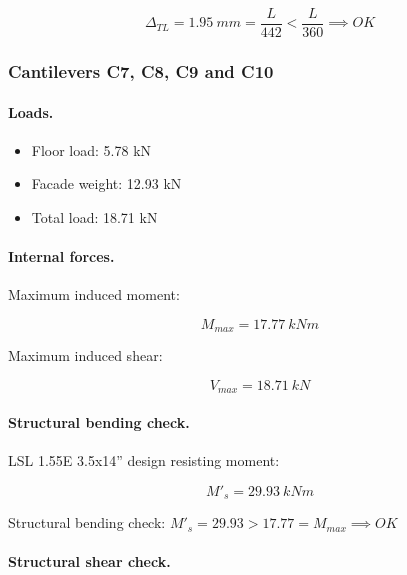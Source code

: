 \begin{equation}
  \Delta_{TL}= 1.95\ mm= \frac{L}{442} < \frac{L}{360} \implies OK
\end{equation}

\subsubsection{Cantilevers C7, C8, C9 and C10}

\paragraph{Loads.}

\begin{itemize}
\item Floor load: 5.78 kN
\item Facade weight: 12.93 kN
\item Total load: 18.71 kN
\end{itemize}

\paragraph{Internal forces.}

\noindent Maximum induced moment:

\begin{equation}
  M_{max}= 17.77\ kN m
\end{equation}

\noindent Maximum induced shear:

\begin{equation}
  V_{max}= 18.71\ kN
\end{equation}

\paragraph{Structural bending check.}

\noindent LSL 1.55E 3.5x14'' design resisting moment:

\begin{equation}
  M'_s= 29.93\ kN m
\end{equation}

\noindent Structural bending check: $M'_s = 29.93 > 17.77 = M_{max} \implies OK$

\paragraph{Structural shear check.}

